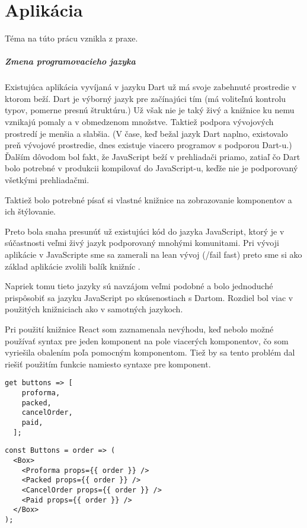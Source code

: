 \chapter{Aplikácia}
Téma na túto prácu vznikla z praxe. 

\paragraph{Zmena programovacieho jazyka}
Existujúca aplikácia vyvíjaná v jazyku Dart už má svoje zabehnuté prostredie v ktorom beží. Dart je výborný jazyk pre začínajúci tím (má voliteľnú kontrolu typov, pomerne presnú štruktúru.) Už však nie je taký živý a knižnice ku nemu vznikajú pomaly a v obmedzenom množstve. 
Taktiež podpora vývojových prostredí je menšia a slabšia. (V čase, keď bežal jazyk Dart naplno, existovalo preň vývojové prostredie, dnes existuje viacero programov s podporou Dart-u.) 
Ďalším dôvodom bol fakt, že JavaScript beží v prehliadači priamo, zatiaľ čo Dart bolo potrebné v produkcii kompilovať do JavaScript-u, keďže nie je podporovaný všetkými prehliadačmi.

Taktiež bolo potrebné písať si vlastné knižnice na zobrazovanie komponentov a ich štýlovanie.

Preto bola snaha presunúť už existujúci kód do jazyka JavaScript, ktorý je v súčastnosti veľmi živý jazyk podporovaný mnohými komunitami. Pri vývoji aplikácie v JavaScripte sme sa zamerali na lean vývoj (/fail fast) preto sme si ako základ aplikácie zvolili balík knižníc \cite[este]{Este}.

Napriek tomu tieto jazyky sú navzájom veľmi podobné a bolo jednoduché prispôsobiť sa jazyku JavaScript po skúsenostiach s Dartom.
Rozdiel bol viac v použitých knižniciach ako v samotných jazykoch.

Pri použití knižnice React som zaznamenala nevýhodu, keď nebolo možné používať syntax pre jeden komponent na pole viacerých komponentov, čo som vyriešila obalením poľa pomocným komponentom. Tiež by sa tento problém dal riešiť použitím funkcie namiesto syntaxe pre komponent.

\begin{lstlisting}[caption=Pole komponentov v Darte]
  get buttons => [
    proforma,
    packed,
    cancelOrder,
    paid,
  ];
\end{lstlisting}

\begin{lstlisting}[caption=Pole komponentov v JavaScripte s použitím knižnice Redux]
const Buttons = order => (
  <Box>
    <Proforma props={{ order }} />
    <Packed props={{ order }} />
    <CancelOrder props={{ order }} />
    <Paid props={{ order }} />
  </Box>
);
\end{lstlisting}

